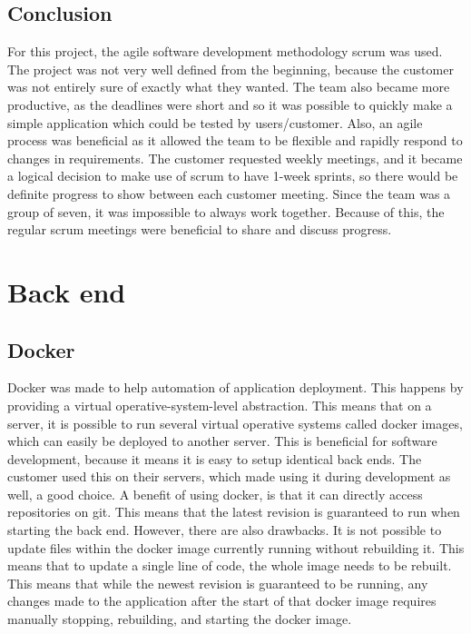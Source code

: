 \subsection{Conclusion}
For this project, the agile software development methodology scrum was used. The project was not very well defined from the beginning, because the customer was not entirely sure of exactly what they wanted. The team also became more productive, as the deadlines were short and so it was possible to quickly make a simple application which could be tested by users/customer. Also, an agile process was beneficial as it allowed the team to be flexible and rapidly respond to changes in requirements. The customer requested weekly meetings, and it became a logical decision to make use of scrum to have 1-week  sprints, so there would be definite progress to show between each customer meeting. Since the team was a group of seven, it was impossible to always work together. Because of this, the regular scrum meetings were beneficial to share and discuss progress.

\section{Back end}

\subsection{Docker}
\label{subsec:docker}

Docker \cite{EHW2} was made to help automation of application deployment. This happens by providing a virtual operative-system-level abstraction. This means that on a server, it is possible to run several virtual operative systems called docker images, which can easily be deployed to another server. This is beneficial for software development, because it means it is easy to setup identical back ends. The customer used this on their servers, which made using it during development as well, a good choice. A benefit of using docker, is that it can directly access repositories on git. This means that the latest revision is guaranteed to run when starting the back end. However, there are also drawbacks. It is not possible to update files within the docker image currently running without rebuilding it. This means that to update a single line of code, the whole image needs to be rebuilt. This means that while the newest revision is guaranteed to be running, any changes made to the application after the start of that docker image requires manually stopping, rebuilding, and starting the docker image.

